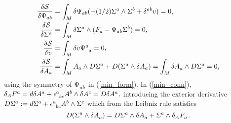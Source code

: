 \documentclass[a4paper,12pt, onecolumn, notitlepage]{article}
\theoremstyle{definition}
\theoremstyle{remark}
\newcommand{\e}{\epsilon}
\begin{document}
\begin{subequations}
\begin{align}
	\label{min_sym}
	\frac{\delta\mathcal{S}}{\delta\Psi_{ab}} &= \int_{M}\delta\Psi_{ab}(- (1/2)\Sigma^{a}\wedge\Sigma^{b} + \delta^{ab}v) = 0,\\
	\label{min_form}
	\frac{\delta\mathcal{S}}{\delta\Sigma^{a}} &= \int_{M}\delta\Sigma^{a}\wedge(F_{a} - \Psi_{ab}\Sigma^{b}) = 0,\\
	\label{min_vol}
	\frac{\delta\mathcal{S}}{\delta v} &= \int_{M}\delta v\Psi\indices{^a_a} = 0,\\
	\label{min_conn}
	\frac{\delta\mathcal{S}}{\delta A_{a}} &= \int_{M}A_{a}\wedge D\Sigma^{a} + D(\Sigma^{a}\wedge\delta A_{a}) = \int_{M}\delta A\indices{_a}\wedge D\Sigma\indices{^a} = 0,
	\end{align}
\end{subequations}
using the symmetry of $\Psi\indices{_a_b}$ in (\ref{min_form}). In (\ref{min_conn}), $\delta_{A} F\indices{^a}=d\delta A\indices{^a}+\e\indices{^a_b_c}A\indices{^b}\wedge \delta A\indices{^c} = D\delta A\indices{^a},$ introducing the exterior derivative $D\Sigma\indices{^a} := d\Sigma\indices{^a}+ \e\indices{^a_b_c}A\indices{^b}\wedge\Sigma\indices{^c}$ which from the Leibniz rule satisfies
\begin{equation*}
	D(\Sigma\indices{^a}\wedge\delta A\indices{_a})=D\Sigma\indices{^a}\wedge\delta A\indices{_a} + \Sigma\indices{^a}\wedge \delta\indices{_A}F\indices{_a}.
\end{equation*}
\end{document}
